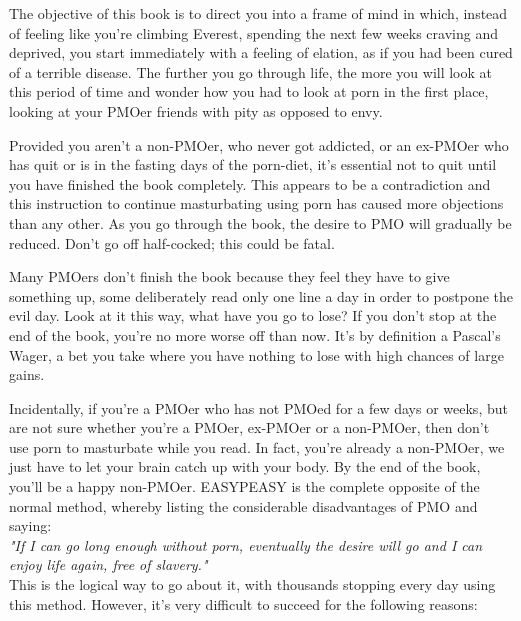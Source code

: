 \documentclass[easypeasy.tex]{subfiles}
\begin{document}
The objective of this book is to direct you into a frame of mind in which, instead of feeling like you're climbing Everest, spending the next few weeks craving and deprived, you start immediately with a feeling of elation, as if you had been cured of a terrible disease. The further you go through life, the more you will look at this period of time and wonder how you had to look at porn in the first place, looking at your PMOer friends with pity as opposed to envy.

Provided you aren't a non-PMOer, who never got addicted, or an ex-PMOer who has quit or is in the fasting days of the porn-diet, it's essential not to quit until you have finished the book completely. This appears to be a contradiction and this instruction to continue masturbating using porn has caused more objections than any other. As you go through the book, the desire to PMO will gradually be reduced. Don't go off half-cocked; this could be fatal.

Many PMOers don't finish the book because they feel they have to give something up, some deliberately read only one line a day in order to postpone the evil day. Look at it this way, what have you go to lose? If you don't stop at the end of the book, you're no more worse off than now. It's by definition a Pascal's Wager, a bet you take where you have nothing to lose with high chances of large gains.

Incidentally, if you're a PMOer who has not PMOed for a few days or weeks, but are not sure whether you're a PMOer, ex-PMOer or a non-PMOer, then don't use porn to masturbate while you read. In fact, you're already a non-PMOer, we just have to let your brain catch up with your body. By the end of the book, you'll be a happy non-PMOer. EASYPEASY is the complete opposite of the normal method, whereby listing the considerable disadvantages of PMO and saying:\\
\textit{"If I can go long enough without porn, eventually the desire will go and I can enjoy life again, free of slavery."}\\
This is the logical way to go about it, with thousands stopping every day using this method. However, it's very difficult to succeed for the following reasons:
\end{document}
